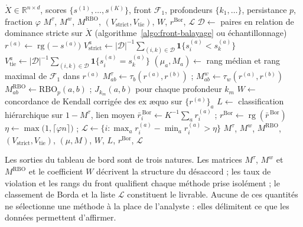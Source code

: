 \documentclass[11pt,a4paper]{article}
\theoremstyle{definition}
\theoremstyle{remark}
\newcommand{\R}{\mathbb{R}}
\newcommand{\abs}[1]{\left\lvert #1 \right\rvert}
\newcommand{\ind}[1]{\mathbf{1}\{#1\}}
\newcommand{\Xor}{\mathring{X}}
\newcommand{\rg}{\operatorname{rg}}
\begin{document}
\medskip

\begin{algorithm}[htbp]
  \caption{Tableau de bord de cohérence}
  \label{algo:coherence}
  \begin{algorithmic}[1]
    \Require $\Xor \in \R^{n\times d}$, scores $\{s^{(1)},\dots,s^{(K)}\}$,
             front $\mathcal{F}_1$, profondeurs $\{k_1,\dots\}$, persistance $p$,
             fraction $\varphi$
    \Ensure $M^\tau$, $M^{w}$, $M^{\mathrm{RBO}}$, $(V_{\mathrm{strict}}, V_{\mathrm{tie}})$,
            $W$, $r^{\mathrm{Bor}}$, $\mathcal{L}$
    \State $\mathcal{D} \gets$ paires en relation de dominance stricte sur $\Xor$
           (algorithme~\ref{algo:front-balayage} ou échantillonnage)
      \State $r^{(a)} \gets \rg\big(-s^{(a)}\big)$
      \State $V^{a}_{\mathrm{strict}} \gets \abs{\mathcal{D}}^{-1}
             \sum_{(i,k)\in\mathcal{D}} \ind{s^{(a)}_i < s^{(a)}_k}$
      \State $V^{a}_{\mathrm{tie}} \gets \abs{\mathcal{D}}^{-1}
             \sum_{(i,k)\in\mathcal{D}} \ind{s^{(a)}_i = s^{(a)}_k}$
      \State $(\mu_a, M_a) \gets$ rang médian et rang maximal de $\mathcal{F}_1$
             dans $r^{(a)}$
        \State $M^\tau_{ab} \gets \tau_b(r^{(a)}, r^{(b)})$ ; \quad
               $M^{w}_{ab} \gets \tau_w(r^{(a)}, r^{(b)})$
        \State $M^{\mathrm{RBO}}_{ab} \gets \mathrm{RBO}_p(a,b)$ ; \quad
               $J_{k_m}(a,b)$ pour chaque profondeur $k_m$
      \EndFor
    \EndFor
    \State $W \gets$ concordance de Kendall corrigée des ex \ae quo sur $\{r^{(a)}\}_a$
    \State $L \gets$ classification hiérarchique sur $1 - M^\tau$, lien moyen
    \State $\bar{r}^{\,\mathrm{Bor}}_i \gets K^{-1}\sum_a r^{(a)}_i$ ; \quad
           $r^{\mathrm{Bor}} \gets \rg(\bar{r}^{\,\mathrm{Bor}})$
    \State $\eta \gets \max\big(1, \lceil \varphi n \rceil\big)$ ; \quad
           $\mathcal{L} \gets \{ i : \max_a r^{(a)}_i - \min_a r^{(a)}_i > \eta \}$
    \State \Return $M^\tau$, $M^{w}$, $M^{\mathrm{RBO}}$, $(V_{\mathrm{strict}},
           V_{\mathrm{tie}})$, $(\mu, M)$, $W$, $L$, $r^{\mathrm{Bor}}$, $\mathcal{L}$
  \end{algorithmic}
\end{algorithm}

\bigskip

Les sorties du tableau de bord sont de trois natures. Les matrices $M^\tau$, $M^{w}$ et
$M^{\mathrm{RBO}}$ et le coefficient $W$ décrivent la structure du désaccord ; les taux de
violation et les rangs du front qualifient chaque méthode prise isolément ; le classement de
Borda et la liste $\mathcal{L}$ constituent le livrable. Aucune de ces quantités ne
sélectionne une méthode à la place de l'analyste : elles délimitent ce que les données
permettent d'affirmer.
\end{document}
